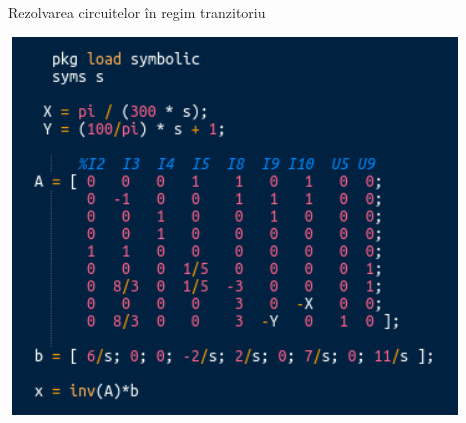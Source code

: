 \documentclass[a4paper]{article}
\begin{document}
\begin{section}{Rezolvarea circuitelor \^ in regim tranzitoriu \\[0.5cm]}
\begin{itemize}
\begin{center}
	\includegraphics[width=12cm, height=10cm]{symb.png}
\end{center}
\end{itemize}
\end{section}
\pagebreak

\end{document}
